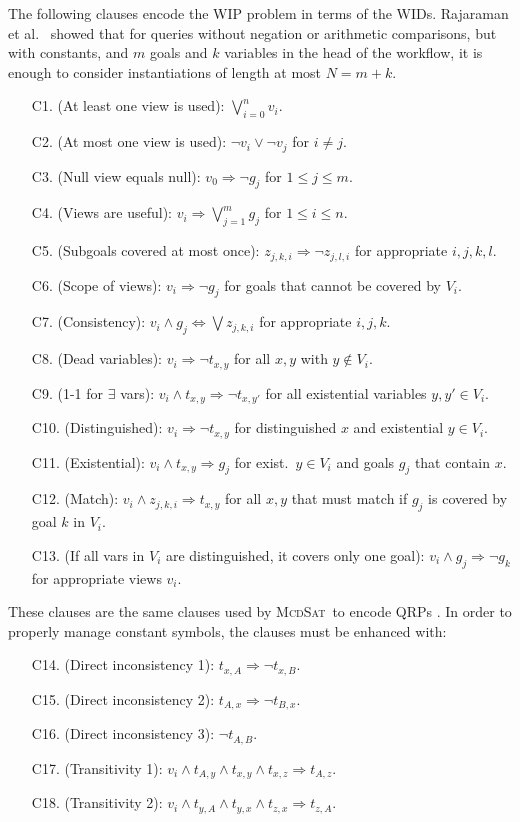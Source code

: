 \documentclass{llncs}
\newcommand{\mcdsat}{\textsc{McdSat}}
\begin{document}
The following clauses encode the WIP problem in terms of the WIDs.
Rajaraman et al.\ \cite{RajaramanSU95} showed that for queries without negation or
arithmetic comparisons, but with constants, and $m$ goals and $k$ variables in the
head of the workflow, it is enough to consider instantiations of length at most $N=m+k$.
\begin{enumerate}[C10.]
\item[C1.] (At least one view is used): $\bigvee_{i=0}^n v_i$.
\item[C2.] (At most one view is used): $\neg v_i\lor\neg v_j$ for $i\neq j$.
\item[C3.] (Null view equals null): $v_0 \Rightarrow \neg g_j$ for $1\leq j\leq m$.
\item[C4.] (Views are useful): $v_i \Rightarrow \bigvee_{j=1}^m g_j$ for $1\leq i\leq n$.
\item[C5.] (Subgoals covered at most once): $z_{j,k,i} \Rightarrow \neg z_{j,l,i}$ for appropriate $i,j,k,l$.
\item[C6.] (Scope of views): $v_i \Rightarrow \neg g_j$ for goals that cannot be covered by $V_i$.
\item[C7.] (Consistency): $v_i \land g_j \Leftrightarrow \bigvee z_{j,k,i}$ for appropriate $i,j,k$.
\item[C8.] (Dead variables): $v_i \Rightarrow \neg t_{x,y}$ for all $x,y$ with $y\notin V_i$.
\item[C9.] (1-1 for $\exists$ vars): $v_i \land t_{x,y} \Rightarrow \neg t_{x,y'}$ for all
           existential variables $y,y'\in V_i$.
\item[C10.] (Distinguished): $v_i \Rightarrow \neg t_{x,y}$ for distinguished $x$ and existential
            $y\in V_i$.
\item[C11.] (Existential): $v_i\land t_{x,y}\Rightarrow g_j$ for exist.\ $y\in V_i$ and
            goals $g_j$ that contain $x$.
\item[C12.] (Match): $v_i\land z_{j,k,i} \Rightarrow t_{x,y}$ for all $x,y$ that must match
            if $g_j$ is covered by goal $k$ in $V_i$.
\item[C13.] (If all vars in $V_i$ are distinguished, it covers only one goal):
            $v_i \land g_j \Rightarrow \neg g_k$ for appropriate views $v_i$.
\end{enumerate}
These clauses are the same clauses used by \mcdsat\ to encode QRPs \cite{arvelo:aaai06}.
In order to properly manage constant symbols, the clauses must be enhanced with:
\begin{enumerate}[C10.]
\item[C14.] (Direct inconsistency 1): $t_{x,A} \Rightarrow \neg t_{x,B}$.
\item[C15.] (Direct inconsistency 2): $t_{A,x} \Rightarrow \neg t_{B,x}$.
\item[C16.] (Direct inconsistency 3): $\neg t_{A,B}$.
\item[C17.] (Transitivity 1): $v_i\land t_{A,y}\land t_{x,y}\land t_{x,z}\Rightarrow t_{A,z}$.
\item[C18.] (Transitivity 2): $v_i\land t_{y,A}\land t_{y,x}\land t_{z,x}\Rightarrow t_{z,A}$.
\end{enumerate}
\end{document}
